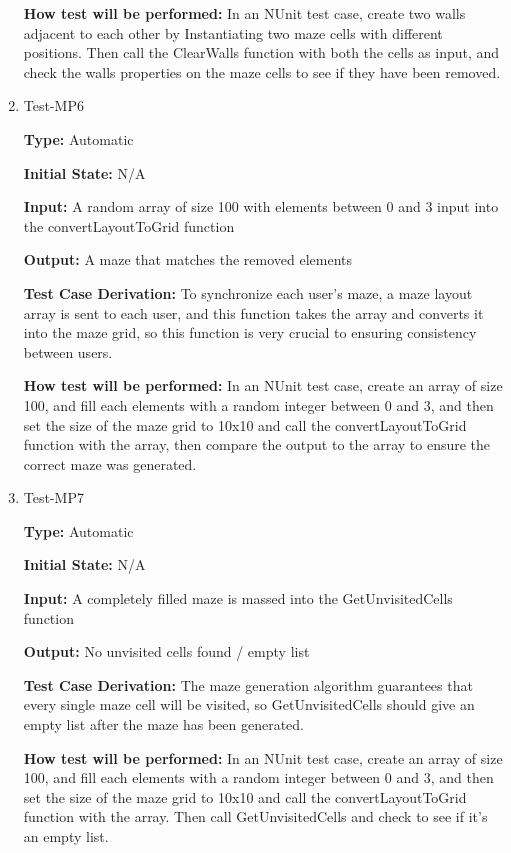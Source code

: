 \documentclass[12pt, titlepage]{article}
\begin{document}
\begin{enumerate}
 \textbf{How test will be performed:} In an NUnit test case, create two walls adjacent to each other by Instantiating two maze cells with different positions. Then call the ClearWalls function with both the cells as input, and check the walls properties on the maze cells to see if they have been removed.

 \item{Test-MP6\\}

 \textbf{Type:} Automatic
					
 \textbf{Initial State:} N/A
					
 \textbf{Input:}  A random array of size 100 with elements between 0 and 3 input into the convertLayoutToGrid function
					
 \textbf{Output:} A maze that matches the removed elements

 \textbf{Test Case Derivation:} To synchronize each user's maze, a maze layout array is sent to each user, and this function takes the array and converts it into the maze grid, so this function is very crucial to ensuring consistency between users.

 \textbf{How test will be performed:} In an NUnit test case, create an array of size 100, and fill each elements with a random integer between 0 and 3, and then set the size of the maze grid to 10x10 and call the convertLayoutToGrid function with the array, then compare the output to the array to ensure the correct maze was generated.

 \item{Test-MP7\\}

 \textbf{Type:} Automatic
					
 \textbf{Initial State:} N/A
					
 \textbf{Input:}  A completely filled maze is massed into the GetUnvisitedCells function
					
 \textbf{Output:} No unvisited cells found / empty list

 \textbf{Test Case Derivation:} The maze generation algorithm guarantees that every single maze cell will be visited, so GetUnvisitedCells should give an empty list after the maze has been generated. 

 \textbf{How test will be performed:} In an NUnit test case, create an array of size 100, and fill each elements with a random integer between 0 and 3, and then set the size of the maze grid to 10x10 and call the convertLayoutToGrid function with the array. Then call GetUnvisitedCells and check to see if it's an empty list.
 
 \end{enumerate}
\end{document}
